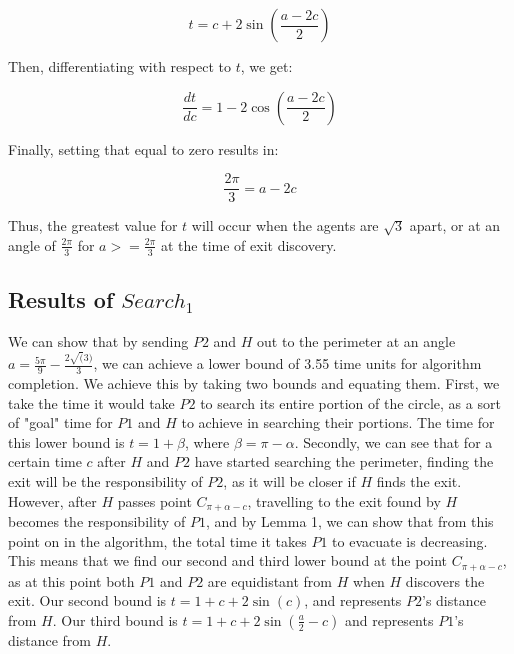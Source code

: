 \documentclass[11pt]{article}
\begin{document}
\begin{flushleft}
\[ t = c + 2 \sin (\frac{a - 2c}{2}) \]

\vspace*{5mm} Then, differentiating with respect to $t$, we get:

\[ \frac{dt}{dc} = 1 - 2 \cos (\frac{a - 2c}{2}) \]

\vspace*{5mm} Finally, setting that equal to zero results in:

\[ \frac{2\pi}{3} = a - 2c \]

\vspace*{5mm} Thus, the greatest value for $t$ will occur when the agents are $\sqrt{3}$ apart,
or at an angle of $ \frac{2\pi}{3}$ for $a >= \frac{2\pi}{3}$ at the time of exit discovery.

\subsection{Results of $Search_{1}$}

We can show that by sending $P2$ and $H$ out to the perimeter at an angle $a = \frac{5\pi}{9} -
\frac{2\sqrt(3)}{3}$, we can achieve a lower bound of 3.55 time units for algorithm completion.
We achieve this by taking two bounds and equating them. First, we take the time it would take $P2$ to
search its entire portion of the circle, as a sort of "goal" time for $P1$ and $H$ to achieve in searching
their portions. The time for this lower bound is $t = 1 + \beta$, where $\beta = \pi - \alpha$.
Secondly, we can see that for a certain time $c$ after $H$ and $P2$ have started searching the perimeter,
finding the exit will be the responsibility of $P2$, as it will be closer if $H$ finds the exit.
However, after $H$ passes point
$C_{\pi + \alpha - c}$, travelling to the exit found by $H$ becomes
the responsibility of $P1$, and by Lemma 1, we can show that
from this point on in the algorithm, the total time it takes $P1$ to evacuate is decreasing.
This means that we find our second and third lower bound at the point $C_{\pi + \alpha - c}$, as at this
point both $P1$ and $P2$ are equidistant from $H$ when $H$ discovers the exit.
Our second bound is $t = 1 + c + 2\sin(c)$, and represents $P2$'s distance from $H$. Our third bound is
$t = 1 + c + 2\sin(\frac{a}{2} - c)$ and represents $P1$'s distance from $H$. 

\vfill

\end{flushleft}
\end{document}
